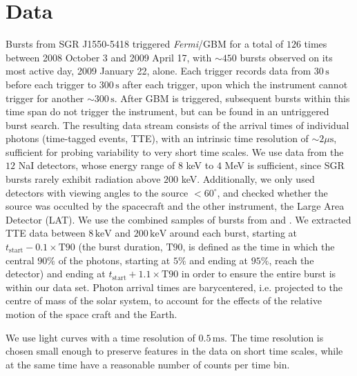 \documentclass[12pt]{emulateapj}
\newcommand{\project}[1]{\textsl{#1}}
\newcommand{\Fermi}{\project{Fermi}}
\begin{document}

\section{Data}

Bursts from SGR J1550-5418 triggered \Fermi/GBM for a total of $126$ times between 2008 October 3 and 2009 April 17, with $\sim 450$ bursts observed on its most active day, 2009 January 22, alone. 
Each trigger records data from $30\,\mathrm{s}$ before each trigger to $300\,\mathrm{s}$ after each trigger, upon which the instrument cannot trigger for another $\sim 300 \,\mathrm{s}$. 
After GBM is triggered, subsequent bursts within this time span do not trigger the instrument, but can be found in an untriggered burst search. The resulting data stream consists of 
the arrival times of individual photons (time-tagged events, TTE), with an intrinsic time resolution of $\sim 2\mu\mathrm{s}$, sufficient for probing variability to very short time scales.
We use data from the $12$ NaI detectors, whose energy range of $8$ keV to $4$ MeV is sufficient, since SGR bursts rarely exhibit radiation above $200$ keV. Additionally, we only used detectors with viewing angles to the source $< 60^{\circ}$, and checked whether the source was occulted by the spacecraft and the other instrument, the Large Area Detector (LAT). We use the combined samples of bursts from \citet{vonkienlin2012} and \citet{vanderhorst2012}. 
We extracted TTE data between $8 \, \mathrm{keV}$ and $200 \, \mathrm{keV}$ around each burst, starting at $t_{\mathrm{start}} - 0.1 \times\mathrm{T}90$ (the burst duration, $\mathrm{T}90$, is defined as the time in which the central $90\%$ of the photons, starting at $5\%$ and ending at $95\%$, reach the detector) and ending at $t_{\mathrm{start}} + 1.1\times\mathrm{T}90$ in order to ensure the entire burst is within our data set. Photon arrival times are barycentered, i.e. projected to the centre of mass of the solar system, to account for the effects of the relative motion of the space craft and the Earth.

We use light curves with a time resolution of $0.5\,\mathrm{ms}$. The time resolution is chosen small enough to preserve features
in the data on short time scales, while at the same time have a reasonable number of counts per time bin. 
\end{document}
